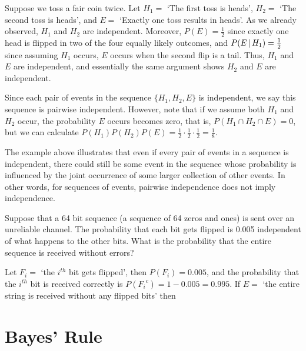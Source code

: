 \begin{examp}
Suppose we toss a fair coin twice. Let $H_1 =$ `The first toss is heads', $H_2 =$ `The second toss is heads', and $E =$ `Exactly one toss results in heads'. As we already observed, $H_1$ and $H_2$ are independent. Moreover, $P(E) = \frac{1}{2}$ since exactly one head is flipped in two of the four equally likely outcomes, and $P(E \,|\, H_1) = \frac{1}{2}$ since assuming $H_1$ occurs, $E$ occurs when the second flip is a tail. Thus, $H_1$ and $E$ are independent, and essentially the same argument shows $H_2$ and $E$ are independent.
\par
\noindent Since each pair of events in the sequence $\{H_1, H_2, E\}$ is independent, we say this sequence is pairwise independent. However, note that if we assume both $H_1$ and $H_2$ occur, the probability $E$ occurs becomes zero, that is, $P(H_1 \cap H_2 \cap E) = 0$, but we can calculate $P(H_1)P(H_2)P(E) = \frac{1}{2}\cdot\frac{1}{2}\cdot\frac{1}{2} = \frac{1}{8}$.
\end{examp}
\par
The example above illustrates that even if every pair of events in a sequence is independent, there could still be some event in the sequence whose probability is influenced by the joint occurrence of some larger collection of other events. In other words, for sequences of events, pairwise independence does not imply independence.
\par
\begin{examp}
Suppose that a 64 bit sequence (a sequence of 64 zeros and ones) is sent over an unreliable channel. The probability that each bit gets flipped is 0.005 independent of what happens to the other bits. What is the probability that the entire sequence is received without errors?
\par
\noindent Let $F_i = $ `the $i^{th}$ bit gets flipped', then $P(F_i) = 0.005$, and the probability that the $i^{th}$ bit is received correctly is $P({F_i}^c) = 1-0.005 = 0.995$. If $E =$ `the entire string is received without any flipped bits' then
\end{examp}

\section{Bayes' Rule}

